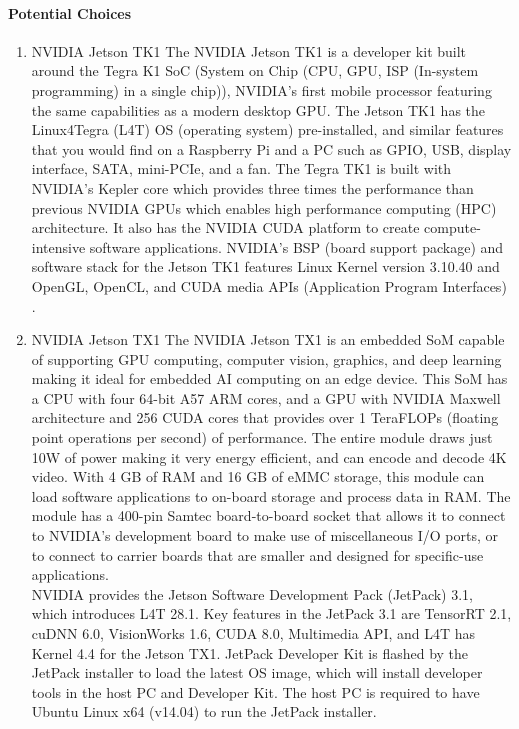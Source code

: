 \paragraph{Potential Choices}
	\begin{enumerate}
		\item{NVIDIA Jetson TK1}
			The NVIDIA Jetson TK1 is a developer kit built around the Tegra K1 SoC (System 
			on Chip (CPU, GPU, ISP (In-system programming) in a single chip)), NVIDIA's first 
			mobile processor featuring the same capabilities as a 
			modern desktop GPU\cite{JetsonTK1, TK1Wiki}. The Jetson TK1 has the Linux4Tegra (L4T)
			OS (operating system) pre-installed, and similar features that you would find on a 
			Raspberry Pi and a PC such as GPIO, USB, display interface, SATA, mini-PCIe, and a
			fan\cite{RPiHDWR, TK1Wiki}. The Tegra TK1 is built with NVIDIA's Kepler core which 
			provides three times the performance than previous NVIDIA GPUs which enables high 
			performance computing (HPC) architecture. It also has the NVIDIA CUDA platform to 
			create compute-intensive software applications\cite{KeplerArch}. NVIDIA's BSP (board 
			support package) and software stack for the Jetson TK1 features Linux Kernel version 
			3.10.40 and OpenGL, OpenCL, and CUDA media APIs (Application Program Interfaces)
			\cite{TK1L4T}. \\

		\item{NVIDIA Jetson TX1}
			The NVIDIA Jetson TX1 is an embedded SoM capable of supporting GPU computing, computer 
			vision, graphics, and deep learning making it ideal for embedded AI computing
			on an edge device. This SoM has a CPU with four 64-bit A57 ARM cores, and a GPU with 
			NVIDIA Maxwell architecture and 256 CUDA cores that provides over 1 TeraFLOPs (floating 
			point operations per second) of performance\cite{TX1Wiki, JetsonGenius}. The entire module 
			draws just 10W of power making it very energy efficient, and can encode and decode 4K 
			video. With 4 GB of RAM and 16 GB of eMMC storage, this module can load software 
			applications to on-board storage and process data in RAM\cite{LinuxDot}. The module has 
			a 400-pin Samtec board-to-board socket that allows it to connect to NVIDIA's development
			board to make use of miscellaneous I/O ports, or to connect to carrier boards that are 
			smaller and designed for specific-use applications.\\

			NVIDIA provides the Jetson Software Development Pack (JetPack) 3.1, which introduces 
			L4T 28.1. Key features in the JetPack 3.1 are TensorRT 2.1, cuDNN 6.0, VisionWorks 1.6, 
			CUDA 8.0, Multimedia API, and L4T has Kernel 4.4 for the Jetson TX1. JetPack Developer 
			Kit is flashed by the JetPack installer to load the latest OS image, which will install 
			developer tools in the host PC and Developer Kit. The host PC is required to have 
			Ubuntu Linux x64 (v14.04) to run the JetPack installer\cite{JetPack, JetPackRel}.\\ 


\end{enumerate}
